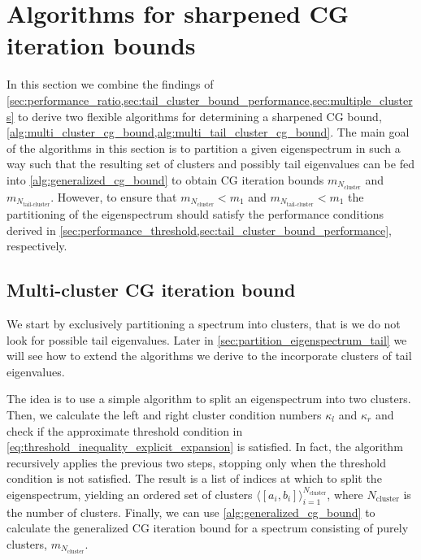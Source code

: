 \section{Algorithms for sharpened CG iteration bounds}\label{sec:cg_iteration_bound_algorithm}
In this section we combine the findings of \cref{sec:performance_ratio,sec:tail_cluster_bound_performance,sec:multiple_clusters} to derive two flexible algorithms for determining a sharpened CG bound, \cref{alg:multi_cluster_cg_bound,alg:multi_tail_cluster_cg_bound}. The main goal of the algorithms in this section is to partition a given eigenspectrum in such a way such that the resulting set of clusters and possibly tail eigenvalues can be fed into \cref{alg:generalized_cg_bound} to obtain CG iteration bounds $m_{N_{\text{cluster}}}$ and $m_{N_{\text{tail-cluster}}}$. However, to ensure that $m_{N_{\text{cluster}}} < m_1$ and $m_{N_{\text{tail-cluster}}} < m_1$ the partitioning of the eigenspectrum should satisfy the performance conditions derived in \cref{sec:performance_threshold,sec:tail_cluster_bound_performance}, respectively.

\subsection{Multi-cluster CG iteration bound}\label{sec:partition_eigenspectrum}
We start by exclusively partitioning a spectrum into clusters, that is we do not look for possible tail eigenvalues. Later in \cref{sec:partition_eigenspectrum_tail} we will see how to extend the algorithms we derive to the incorporate clusters of tail eigenvalues. 

The idea is to use a simple algorithm to split an eigenspectrum into two clusters. Then, we calculate the left and right cluster condition numbers $\kappa_l$ and $\kappa_r$ and check if the approximate threshold condition in \cref{eq:threshold_inequality_explicit_expansion} is satisfied. In fact, the algorithm recursively applies the previous two steps, stopping only when the threshold condition is not satisfied. The result is a list of indices at which to split the eigenspectrum, yielding an ordered set of clusters $\langle[a_i, b_i]\rangle_{i=1}^{N_{\text{cluster}}}$, where $N_{\text{cluster}}$ is the number of clusters. Finally, we can use \cref{alg:generalized_cg_bound} to calculate the generalized CG iteration bound for a spectrum consisting of purely clusters, $m_{N_{\text{cluster}}}$.

